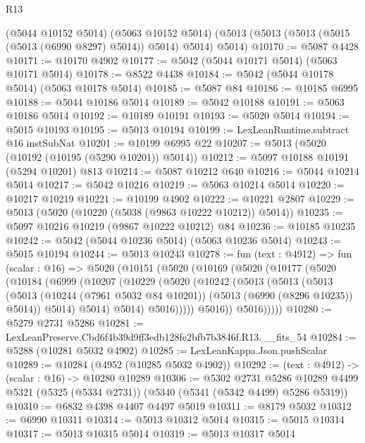 \begin{lexlean}{R13}
\begin{coremodule}
    (@5044 @10152 @5014)
    (@5063 @10152 @5014)
    (@5013 (@5013 (@5013 (@5015 (@5013 (@6990 @8297) @5014)) @5014) @5014) @5014)
@10170 := @5087 @4428
@10171 := @10170 @4902
@10177 := @5042 (@5044 @10171 @5014) (@5063 @10171 @5014)
@10178 := @8522 @4438
@10184 := @5042 (@5044 @10178 @5014) (@5063 @10178 @5014)
@10185 := @5087 @84
@10186 := @10185 @6995
@10188 := @5044 @10186 @5014
@10189 := @5042 @10188
@10191 := @5063 @10186 @5014
@10192 := @10189 @10191
@10193 := @5020 @5014
@10194 := @5015 @10193
@10195 := @5013 @10194
@10199 := LexLeanRuntime.subtract @16 instSubNat
@10201 := @10199 @6995 @22
@10207 := @5013 (@5020 (@10192 (@10195 (@5290 @10201)) @5014))
@10212 := @5097 @10188 @10191 (@5294 @10201) @813
@10214 := @5087 @10212 @640
@10216 := @5044 @10214 @5014
@10217 := @5042 @10216
@10219 := @5063 @10214 @5014
@10220 := @10217 @10219
@10221 := @10199 @4902
@10222 := @10221 @2807
@10229 := @5013 (@5020 (@10220 (@5038 (@9863 @10222 @10212)) @5014))
@10235 := @5097 @10216 @10219 (@9867 @10222 @10212) @84
@10236 := @10185 @10235
@10242 := @5042 (@5044 @10236 @5014) (@5063 @10236 @5014)
@10243 := @5015 @10194
@10244 := @5013 @10243
@10278 := fun (text : @4912) =>
  fun (scalar : @16) =>
  @5020
    (@10151
      (@5020
        (@10169
          (@5020
            (@10177
              (@5020
                (@10184
                  (@6999
                    (@10207
                      (@10229
                        (@5020
                          (@10242
                            (@5013
                              (@5013
                                (@5013
                                  (@5013
                                    (@10244 (@7961 @5032 @84 @10201))
                                    (@5013 (@6990 (@8296 @10235)) @5014))
                                  @5014)
                                @5014)
                              @5014)
                            @5016)))))
                  @5016))
              @5016)))))
@10280 := @5279 @2731 @5286
@10281 := LexLeanPreserve.Cbd6f4b39d9ff3edb128fe2bfb7b3846f.R13.__fits_54
@10284 := @5288 (@10281 @5032 @4902)
@10285 := LexLeanKappa.Json.pushScalar
@10289 := @10284 (@4952 (@10285 @5032 @4902))
@10292 := (text : @4912) -> (scalar : @16) -> @10280 @10289
@10306 := @5302
    @2731
    @5286
    @10289
    @4499
    @5321
    (@5325 (@5334 @2731))
    (@5340 (@5341 (@5342 @4499) @5286 @5319))
@10310 := @6832 @4398 @4407 @4497 @5019
@10311 := @8179 @5032
@10312 := @6990 @10311
@10314 := @5013 @10312 @5014
@10315 := @5015 @10314
@10317 := @5013 @10315 @5014
@10319 := @5013 @10317 @5014

\end{coremodule}
\end{lexlean}
